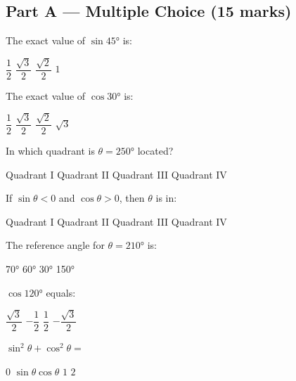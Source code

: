\documentclass[addpoints]{exam}
\begin{document}
\newpage
\begin{questions}

\section*{Part A --- Multiple Choice (15 marks)}
\vspace{5mm}

\question[1] The exact value of $\sin\ang{45}$ is:
\begin{choices}
    \choice $\dfrac{1}{2}$
    \choice $\dfrac{\sqrt{3}}{2}$
    \correctchoice $\dfrac{\sqrt{2}}{2}$
    \choice $1$
\end{choices}

\question[1] The exact value of $\cos\ang{30}$ is:
\begin{choices}
    \choice $\dfrac{1}{2}$
    \correctchoice $\dfrac{\sqrt{3}}{2}$
    \choice $\dfrac{\sqrt{2}}{2}$
    \choice $\sqrt{3}$
\end{choices}

\question[1] In which quadrant is $\theta = \ang{250}$ located?
\begin{choices}
    \choice Quadrant I
    \choice Quadrant II
    \correctchoice Quadrant III
    \choice Quadrant IV
\end{choices}

\question[1] If $\sin\theta < 0$ and $\cos\theta > 0$, then $\theta$ is in:
\begin{choices}
    \choice Quadrant I
    \choice Quadrant II
    \choice Quadrant III
    \correctchoice Quadrant IV
\end{choices}

\question[1] The reference angle for $\theta = \ang{210}$ is:
\begin{choices}
    \choice \ang{70}
    \choice \ang{60}
    \correctchoice \ang{30}
    \choice \ang{150}
\end{choices}

\question[1] $\cos\ang{120}$ equals:
\begin{choices}
    \choice $\dfrac{\sqrt{3}}{2}$
    \correctchoice $-\dfrac{1}{2}$
    \choice $\dfrac{1}{2}$
    \choice $-\dfrac{\sqrt{3}}{2}$
\end{choices}

\question[1] $\sin^2\theta + \cos^2\theta =$
\begin{choices}
    \choice $0$
    \choice $\sin\theta\cos\theta$
    \correctchoice $1$
    \choice $2$
\end{choices}


\end{questions}
\end{document}
